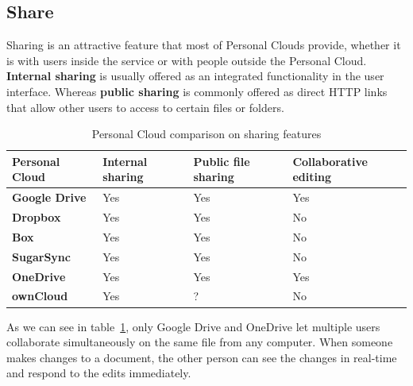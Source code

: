 \subsection{Share}


Sharing is an attractive feature that most of Personal Clouds provide, whether it is with users inside the service or with people outside the Personal Cloud. \textbf{Internal sharing} is usually offered as an integrated functionality in the user interface. Whereas \textbf{public sharing} is commonly offered as direct HTTP links that allow other users to access to certain files or folders.


{
\def\arraystretch{1.5}

\begin{table}
\begin{center}
    \begin{tabular}{ | p{3.3cm} | p{1.5cm} | p{2cm} | p{2.5cm} | }
    \hline
    \rowcolor[gray]{0.8}

	\textbf{Personal Cloud} &
	\textbf{Internal sharing} &
	\textbf{Public file sharing} &
	\textbf{Collaborative editing} \\ \hline

	\textbf{Google Drive} &
	Yes &
	Yes &
	Yes \\ \hline

	\textbf{Dropbox} &
	Yes &
	Yes &
	No \\ \hline
	
	\textbf{Box} &
	Yes &
	Yes &
	No \\ \hline
	
	\textbf{SugarSync} & 
	Yes &
	Yes &
	No \\ \hline
	
	\textbf{OneDrive} & 
	Yes &
	Yes &
	Yes \\ \hline
	
	\textbf{ownCloud} &
	Yes &
	? &
	No \\ \hline

    \end{tabular}
    \caption{Personal Cloud comparison on sharing features}
    \label{tab:pc_sharing}
\end{center}
\end{table}
}

As we can see in table~\ref{tab:pc_sharing}, only Google Drive and OneDrive let multiple users collaborate simultaneously on the same file from any computer. When someone makes changes to a document, the other person can see the changes in real-time and respond to the edits immediately.

